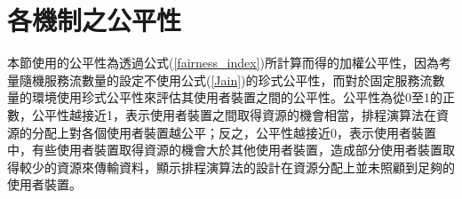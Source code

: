 \clearpage
\section{各機制之公平性}
本節使用的公平性為透過公式(\ref{fairness_index})所計算而得的加權公平性，因為考量隨機服務流數量的設定不使用公式(\ref{Jain})的珍式公平性，而對於固定服務流數量的環境使用珍式公平性來評估其使用者裝置之間的公平性。公平性為從0至1的正數，公平性越接近1，表示使用者裝置之間取得資源的機會相當，排程演算法在資源的分配上對各個使用者裝置越公平；反之，公平性越接近0，表示使用者裝置中，有些使用者裝置取得資源的機會大於其他使用者裝置，造成部分使用者裝置取得較少的資源來傳輸資料，顯示排程演算法的設計在資源分配上並未照顧到足夠的使用者裝置。

